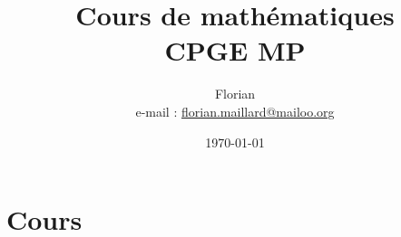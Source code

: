 \documentclass[10pt, a4paper]{book}
\title{\textbf{\Huge Cours de mathématiques \\ CPGE MP}}
\author{Florian \bsc{Maillard}\\ e-mail : \href{mailto:florian.maillard@mailoo.org}{florian.maillard@mailoo.org}}
\date{\today}
\begin{document}
\frontmatter
\maketitle
%
\mainmatter

\part{Cours}







































%
%
\backmatter
\dominitoc
\dominilof
\dominilot
\tableofcontents
\listoffigures
\listoftables
\end{document}
